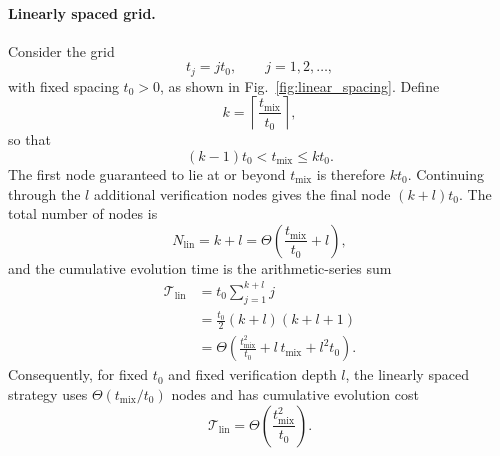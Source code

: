 \documentclass[showpacs,amsmath,amssymb,twocolumn,prx,superscriptaddress,10pt,aps,nofootinbib]{revtex4-2}
\begin{document}
\paragraph{Linearly spaced grid.}
Consider the grid
\begin{equation}
    t_j = j t_0,
    \qquad
    j=1,2,\ldots,
\end{equation}
with fixed spacing $t_0>0$, as shown in Fig.~\ref{fig:linear_spacing}. Define
\begin{equation}
    k
    =
    \left\lceil
        \frac{t_{\mathrm{mix}}}{t_0}
    \right\rceil ,
\end{equation}
so that
\begin{equation}
    (k-1)t_0
    <
    t_{\mathrm{mix}}
    \leq
    k t_0 .
\end{equation}
The first node guaranteed to lie at or beyond $t_{\mathrm{mix}}$ is therefore $k t_0$. Continuing through the $l$ additional verification nodes gives the final node $(k+l)t_0$. The total number of nodes is
\begin{equation}
    N_{\mathrm{lin}} = k+l
    =
    \Theta\!\left(
        \frac{t_{\mathrm{mix}}}{t_0}+l
    \right),
\end{equation}
and the cumulative evolution time is the arithmetic-series sum
\begin{align}
    \mathcal{T}_{\mathrm{lin}}
    &=
    t_0\sum_{j=1}^{k+l} j
    \nonumber\\
    &=
    \frac{t_0}{2}(k+l)(k+l+1)
    \nonumber\\
    &=
    \Theta\!\left(
        \frac{t_{\mathrm{mix}}^2}{t_0}
        +
        l\,t_{\mathrm{mix}}
        +
        l^2 t_0
    \right).
    \label{eq:linear_grid_cost}
\end{align}
Consequently, for fixed $t_0$ and fixed verification depth $l$, the linearly spaced strategy uses $\Theta(t_{\mathrm{mix}}/t_0)$ nodes and has cumulative evolution cost
\begin{equation}
    \mathcal{T}_{\mathrm{lin}}
    =
    \Theta\!\left(
        \frac{t_{\mathrm{mix}}^2}{t_0}
    \right).
\end{equation}
\end{document}
